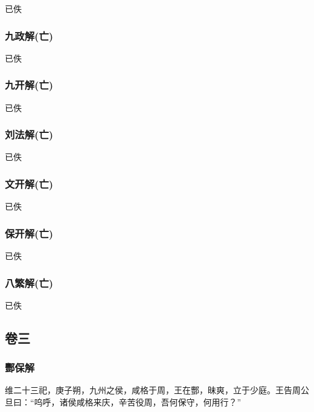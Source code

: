 \documentclass[]{article}
\begin{document}
已佚

\hypertarget{header-n106}{%
\subsubsection{九政解(亡)}\label{header-n106}}

已佚

\hypertarget{header-n110}{%
\subsubsection{九开解(亡)}\label{header-n110}}

已佚

\hypertarget{header-n114}{%
\subsubsection{刘法解(亡)}\label{header-n114}}

已佚

\hypertarget{header-n118}{%
\subsubsection{文开解(亡)}\label{header-n118}}

已佚

\hypertarget{header-n122}{%
\subsubsection{保开解(亡)}\label{header-n122}}

已佚

\hypertarget{header-n126}{%
\subsubsection{八繁解(亡)}\label{header-n126}}

已佚

\hypertarget{header-n130}{%
\subsection{卷三}\label{header-n130}}

\hypertarget{header-n131}{%
\subsubsection{酆保解}\label{header-n131}}

维二十三祀，庚子朔，九州之侯，咸格于周，王在酆，昧爽，立于少庭。王告周公旦曰：``呜呼，诸侯咸格来庆，辛苦役周，吾何保守，何用行？''
\end{document}
